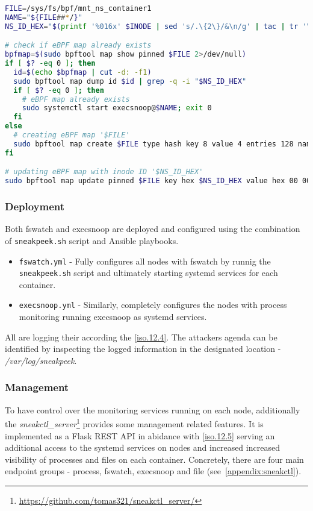 \begin{lstlisting}[language=bash, style=custom, caption={Setup of BPF map for sharing the mount namespave with execsnoop instance. INODE variable is retrieved using the command sequence specified in \autoref{listing:sneakpeek:mntns}}, label=listing:bpftool:snippet]
FILE=/sys/fs/bpf/mnt_ns_container1
NAME="${FILE##*/}"
NS_ID_HEX="$(printf '%016x' $INODE | sed 's/.\{2\}/&\n/g' | tac | tr '\n' ' ')"

# check if eBPF map already exists
bpfmap=$(sudo bpftool map show pinned $FILE 2>/dev/null)
if [ $? -eq 0 ]; then
  id=$(echo $bpfmap | cut -d: -f1)
  sudo bpftool map dump id $id | grep -q -i "$NS_ID_HEX"
  if [ $? -eq 0 ]; then
    # eBPF map already exists
    sudo systemctl start execsnoop@$NAME; exit 0
  fi
else
  # creating eBPF map '$FILE'
  sudo bpftool map create $FILE type hash key 8 value 4 entries 128 name $NAME flags 0
fi

# updating eBPF map with inode ID '$NS_ID_HEX'
sudo bpftool map update pinned $FILE key hex $NS_ID_HEX value hex 00 00 00 00 any
\end{lstlisting}

\subsubsection*{Deployment \label{implementation:mon:hunting:deploy}}
Both fswatch and execsnoop are deployed and configured using the combination of \texttt{sneakpeek.sh} script and Ansible playbooks.
\begin{itemize}
	\item \texttt{fswatch.yml} - Fully configures all nodes with fswatch by runnig the \texttt{sneakpeek.sh} script and ultimately starting systemd services for each container.
	\item \texttt{execsnoop.yml} - Similarly, completely configures the nodes with process monitoring running execsnoop as systemd services.
\end{itemize}
All are logging their according the \ref{iso.12.4}. The attackers agenda can be identified by inspecting the logged information in the designated location - \textit{/var/log/sneakpeek}. 

\subsubsection*{Management \label{implementation:mon:hunting:mgmt}}
To have control over the monitoring services running on each node, additionally the \textit{sneakctl\_server}\footnote{\url{https://github.com/tomas321/sneakctl_server/}} provides some management related features. It is implemented as a Flask REST API in abidance with \ref{iso.12.5} serving an additional access to the systemd services on nodes and increased increased visibility of processes and files on each container. Concretely, there are four main endpoint groups - process, fswatch, execsnoop and file (see~\autoref{appendix:sneakctl}).

